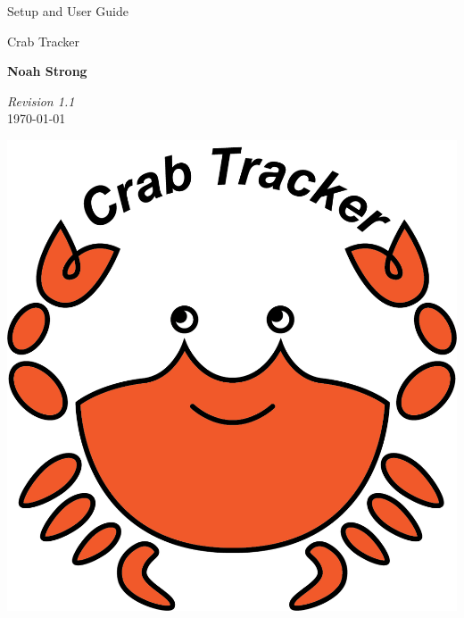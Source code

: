 \documentclass[12pt]{article}
\begin{document}
\begin{titlepage}

\vspace*{5cm}

\begin{huge}
Setup and User Guide
\end{huge}

\begin{large}
Crab Tracker

\vspace*{1cm}

\textbf{Noah Strong}

\vspace*{1cm}
\end{large}

\textit{Revision 1.1}\\
\today

\vfill
\hfill \includegraphics[scale=1]{ct-logo.png}

\end{titlepage}
\tableofcontents{}

\newpage

\end{document}

